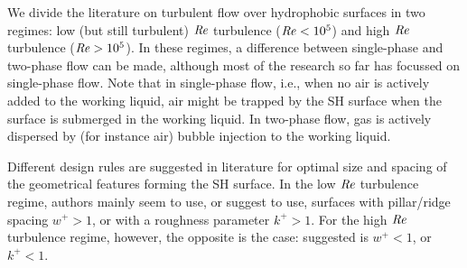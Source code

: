 We divide the literature on turbulent flow over {hydrophobic} surfaces in two regimes: low (but still turbulent) $\mbox{\textit{Re}}$ turbulence ($\mbox{\textit{Re}} < 10^5$) and high $\mbox{\textit{Re}}$ turbulence ($\mbox{\textit{Re}} > 10^5$). In these regimes, a difference between single-phase and two-phase flow can be made, although most of the research so far has focussed on single-phase flow. Note that in single-phase flow, i.e., when no air is actively added to the working liquid, air might be trapped by the SH surface when the surface is submerged in the working liquid. In two-phase flow, gas is actively dispersed by (for instance air) bubble injection to the working liquid.

Different design rules are suggested in literature for optimal size and spacing of the geometrical features forming the SH surface. In the low $\mbox{\textit{Re}}$ turbulence regime, authors mainly seem to use, or suggest to use, surfaces with pillar/ridge spacing $w^+ > 1$, or with a roughness parameter $k^+>1$. For the high $\mbox{\textit{Re}}$ turbulence regime, however, the opposite is the case: suggested is $w^+ < 1$, or $k^+ < 1$. 

